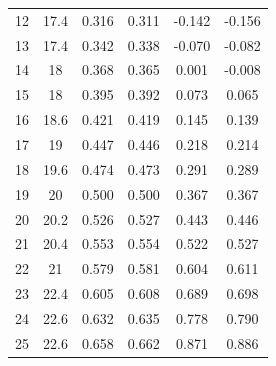 \begin{table}[H]
\begin{tabular}{cccccc}
    12         & 17.4                        & 0.316                      & 0.311                       & -0.142                  & -0.156                  \\
    13         & 17.4                        & 0.342                      & 0.338                       & -0.070                  & -0.082                  \\
    14         & 18                          & 0.368                      & 0.365                       & 0.001                   & -0.008                  \\
    15         & 18                          & 0.395                      & 0.392                       & 0.073                   & 0.065                   \\
    16         & 18.6                        & 0.421                      & 0.419                       & 0.145                   & 0.139                   \\
    17         & 19                          & 0.447                      & 0.446                       & 0.218                   & 0.214                   \\
    18         & 19.6                        & 0.474                      & 0.473                       & 0.291                   & 0.289                   \\
    19         & 20                          & 0.500                      & 0.500                       & 0.367                   & 0.367                   \\
    20         & 20.2                        & 0.526                      & 0.527                       & 0.443                   & 0.446                   \\
    21         & 20.4                        & 0.553                      & 0.554                       & 0.522                   & 0.527                   \\
    22         & 21                          & 0.579                      & 0.581                       & 0.604                   & 0.611                   \\
    23         & 22.4                        & 0.605                      & 0.608                       & 0.689                   & 0.698                   \\
    24         & 22.6                        & 0.632                      & 0.635                       & 0.778                   & 0.790                   \\
    25         & 22.6                        & 0.658                      & 0.662                       & 0.871                   & 0.886                   \\

\end{tabular}
\end{table}

